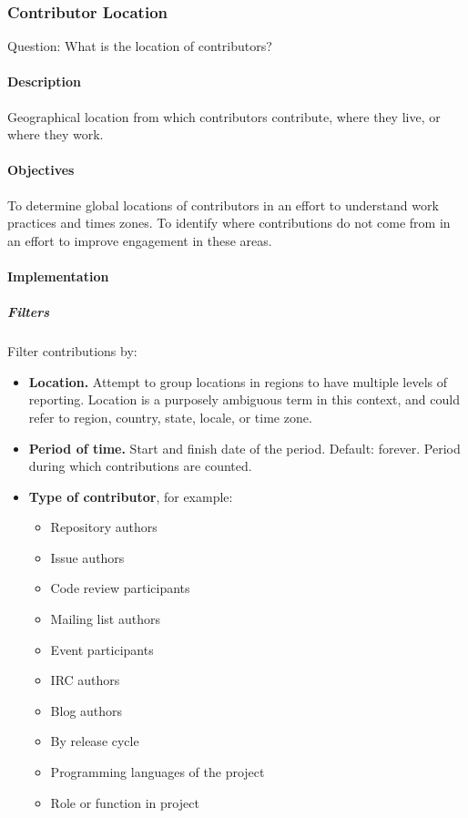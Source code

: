 \hypertarget{contributor-location}{%
\subsubsection{Contributor Location}\label{contributor-location}}

Question: What is the location of contributors?

\hypertarget{description}{%
\paragraph{Description}\label{description}}

Geographical location from which contributors contribute, where they
live, or where they work.

\hypertarget{objectives}{%
\paragraph{Objectives}\label{objectives}}

To determine global locations of contributors in an effort to understand
work practices and times zones. To identify where contributions do not
come from in an effort to improve engagement in these areas.

\hypertarget{implementation}{%
\paragraph{Implementation}\label{implementation}}

\hypertarget{filters}{%
\subparagraph{Filters}\label{filters}}

Filter contributions by:

\begin{itemize}
\tightlist
\item
  \textbf{Location.} Attempt to group locations in regions to have
  multiple levels of reporting. Location is a purposely ambiguous term
  in this context, and could refer to region, country, state, locale, or
  time zone.
\item
  \textbf{Period of time.} Start and finish date of the period. Default:
  forever. Period during which contributions are counted.
\item
  \textbf{Type of contributor}, for example:

  \begin{itemize}
  \tightlist
  \item
    Repository authors
  \item
    Issue authors
  \item
    Code review participants
  \item
    Mailing list authors
  \item
    Event participants
  \item
    IRC authors
  \item
    Blog authors
  \item
    By release cycle
  \item
    Programming languages of the project
  \item
    Role or function in project
  \end{itemize}
\end{itemize}

